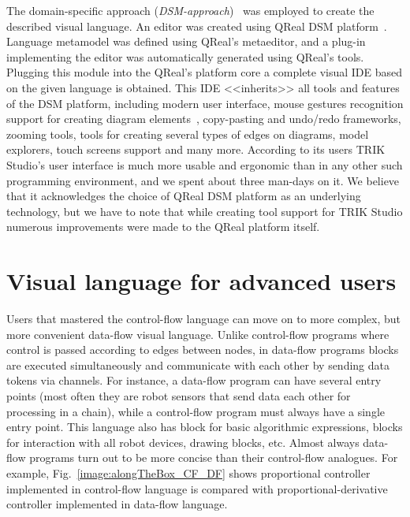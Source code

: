 \documentclass[conference]{IEEEtran}
\begin{document}
The domain-specific approach (\textit{DSM-approach})~\cite{koznov2008} was employed to create the described visual language. An editor was created using QReal DSM platform~\cite{qrealMeta,kuzenkova2013qreal}.  Language metamodel was defined using QReal's metaeditor, and a plug-in implementing the editor was automatically generated using QReal's tools. Plugging this module into the QReal's platform core a complete visual IDE based on the given language is obtained. This IDE <<inherits>> all tools and features of the DSM platform, including modern user interface, mouse gestures recognition support for creating diagram elements~\cite{osechkina2010gestures,osechkina2012multistroke}, copy-pasting and undo/redo frameworks, zooming tools, tools for creating several types of edges on diagrams, model explorers, touch screens support and many more. According to its users TRIK Studio's user interface is much more usable and ergonomic than in any other such programming environment, and we spent about three man-days on it. We believe that it acknowledges the choice of QReal DSM platform as an underlying technology, but we have to note that while creating tool support for TRIK Studio numerous improvements were made to the QReal platform itself.

\section{Visual language for advanced users}
\label{chapter:dataFlowLanguage}

Users that mastered the control-flow language can move on to more complex, but more convenient data-flow visual language. Unlike control-flow programs where control is passed according to edges between nodes, in data-flow programs blocks are executed simultaneously and communicate with each other by sending data tokens via channels. For instance, a data-flow program can have several entry points (most often they are robot sensors that send data each other for processing in a chain), while a control-flow program must always have a single entry point. This language also has block for basic algorithmic expressions, blocks for interaction with all robot devices, drawing blocks, etc. Almost always data-flow programs turn out to be more concise than their control-flow analogues. For example, Fig.~\ref{image:alongTheBox_CF_DF} shows proportional controller implemented in control-flow language is compared with proportional-derivative controller implemented in data-flow language.
\end{document}
